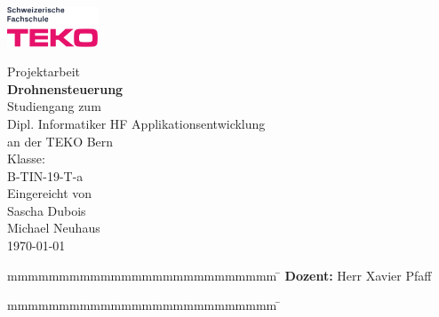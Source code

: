 \newcommand{\arbeit}{Projektarbeit}
\newcommand{\autorS}{Sascha Dubois}
\newcommand{\autorM }{Michael Neuhaus}
\newcommand{\gutachter}{Herr Xavier Pfaff}
\newcommand{\thema}{Drohnensteuerung}
\newcommand{\studiengang}{Dipl. Informatiker HF Applikationsentwicklung}
\newcommand{\studienjahrgang}{B-TIN-19-T-a}
\newcommand{\datumAbgabe}{\today}
\newcommand{\projektabschluss}{31. Oktober 2022 }

\begin{titlepage}
    \includegraphics[width=2.7cm]{content/images/teko.png}
	\enlargethispage{20mm}
	\begin{center}
		\vspace*{12mm}	{\large\normalfont \arbeit}\\
		\vspace*{12mm}	{\huge\bfseries \thema }\\
    \vspace*{12mm}  Studiengang zum \\
		\vspace*{3mm}	  \studiengang\\
    \vspace*{3mm}   an der TEKO Bern\\
    \vspace*{3mm}   Klasse:\\ 
    \vspace*{2mm}   \studienjahrgang\\
		\vspace*{12mm}	Eingereicht von\\
		\vspace*{3mm} 	{\large\normalfont \autorS}\\
    \vspace*{3mm} 	{\large\normalfont \autorM}\\
		\vspace*{12mm}	\datumAbgabe\\
	\end{center}
	\vspace{2cm}
	\begin{figure}[htp]
		\begin{center}
		\end{center}
	\end{figure}
	\vfill
	\begin{spacing}{1.2}
		\begin{tabbing}
			mmmmmmmmmmmmmmmmmmmmmmmmmm      \= \kill
			\textbf{Dozent:}                 \>  \gutachter
		\end{tabbing}
    \begin{tabbing}
      mmmmmmmmmmmmmmmmmmmmmmmmmm      \= \kill
    \end{tabbing}
		\end{spacing}
		\vspace*{20mm}
\end{titlepage}
